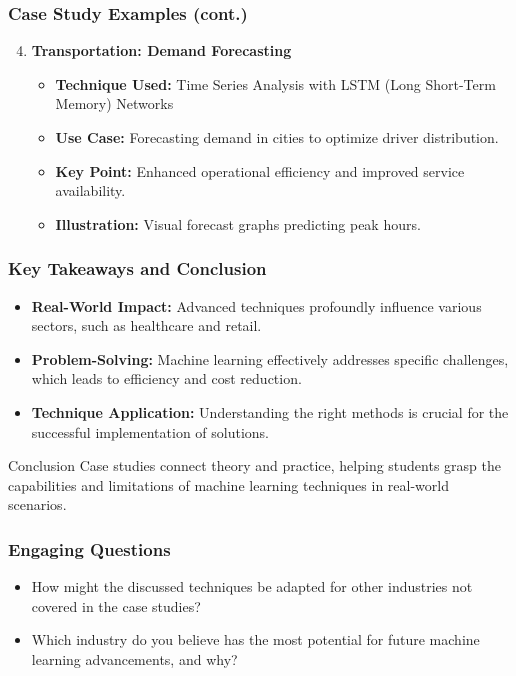 \documentclass[aspectratio=169]{beamer}
\begin{document}
\begin{frame}[fragile]
    \frametitle{Case Study Examples (cont.)}
    \begin{enumerate}
        \setcounter{enumi}{3}
        
        \item \textbf{Transportation: Demand Forecasting}
            \begin{itemize}
                \item \textbf{Technique Used:} Time Series Analysis with LSTM (Long Short-Term Memory) Networks
                \item \textbf{Use Case:} Forecasting demand in cities to optimize driver distribution.
                \item \textbf{Key Point:} Enhanced operational efficiency and improved service availability.
                \item \textbf{Illustration:} Visual forecast graphs predicting peak hours.
            \end{itemize}
    \end{enumerate}
\end{frame}

\begin{frame}[fragile]
    \frametitle{Key Takeaways and Conclusion}
    \begin{itemize}
        \item \textbf{Real-World Impact:} Advanced techniques profoundly influence various sectors, such as healthcare and retail.
        \item \textbf{Problem-Solving:} Machine learning effectively addresses specific challenges, which leads to efficiency and cost reduction.
        \item \textbf{Technique Application:} Understanding the right methods is crucial for the successful implementation of solutions.
    \end{itemize}
    
    \begin{block}{Conclusion}
        Case studies connect theory and practice, helping students grasp the capabilities and limitations of machine learning techniques in real-world scenarios.
    \end{block}
\end{frame}

\begin{frame}[fragile]
    \frametitle{Engaging Questions}
    \begin{itemize}
        \item How might the discussed techniques be adapted for other industries not covered in the case studies?
        \item Which industry do you believe has the most potential for future machine learning advancements, and why?
    \end{itemize}
\end{frame}
\end{document}
